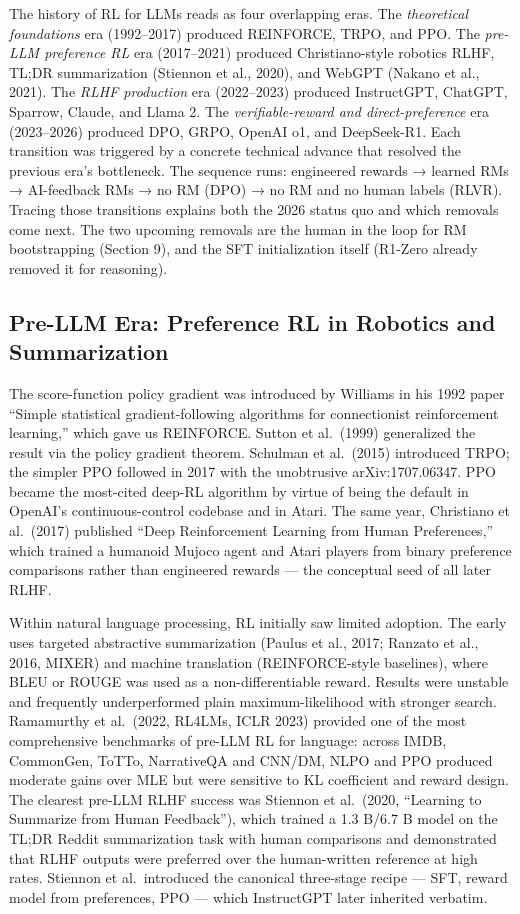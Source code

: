 The history of RL for LLMs reads as four overlapping eras. The \emph{theoretical foundations} era (1992--2017) produced REINFORCE, TRPO, and PPO. The \emph{pre-LLM preference RL} era (2017--2021) produced Christiano-style robotics RLHF, TL;DR summarization (Stiennon et al., 2020), and WebGPT (Nakano et al., 2021). The \emph{RLHF production} era (2022--2023) produced InstructGPT, ChatGPT, Sparrow, Claude, and Llama 2. The \emph{verifiable-reward and direct-preference} era (2023--2026) produced DPO, GRPO, OpenAI o1, and DeepSeek-R1. Each transition was triggered by a concrete technical advance that resolved the previous era's bottleneck. The sequence runs: engineered rewards → learned RMs → AI-feedback RMs → no RM (DPO) → no RM and no human labels (RLVR). Tracing those transitions explains both the 2026 status quo and which removals come next. The two upcoming removals are the human in the loop for RM bootstrapping (Section 9), and the SFT initialization itself (R1-Zero already removed it for reasoning).

\subsection{Pre-LLM Era: Preference RL in Robotics and Summarization}\label{pre-llm-era-preference-rl-in-robotics-and-summarization}

The score-function policy gradient was introduced by Williams in his 1992 paper ``Simple statistical gradient-following algorithms for connectionist reinforcement learning,'' which gave us REINFORCE. Sutton et al.~(1999) generalized the result via the policy gradient theorem. Schulman et al.~(2015) introduced TRPO; the simpler PPO followed in 2017 with the unobtrusive arXiv:1707.06347. PPO became the most-cited deep-RL algorithm by virtue of being the default in OpenAI's continuous-control codebase and in Atari. The same year, Christiano et al.~(2017) published ``Deep Reinforcement Learning from Human Preferences,'' which trained a humanoid Mujoco agent and Atari players from binary preference comparisons rather than engineered rewards --- the conceptual seed of all later RLHF.

Within natural language processing, RL initially saw limited adoption. The early uses targeted abstractive summarization (Paulus et al., 2017; Ranzato et al., 2016, MIXER) and machine translation (REINFORCE-style baselines), where BLEU or ROUGE was used as a non-differentiable reward. Results were unstable and frequently underperformed plain maximum-likelihood with stronger search. Ramamurthy et al.~(2022, RL4LMs, ICLR 2023) provided one of the most comprehensive benchmarks of pre-LLM RL for language: across IMDB, CommonGen, ToTTo, NarrativeQA and CNN/DM, NLPO and PPO produced moderate gains over MLE but were sensitive to KL coefficient and reward design. The clearest pre-LLM RLHF success was Stiennon et al.~(2020, ``Learning to Summarize from Human Feedback''), which trained a 1.3 B/6.7 B model on the TL;DR Reddit summarization task with human comparisons and demonstrated that RLHF outputs were preferred over the human-written reference at high rates. Stiennon et al.~introduced the canonical three-stage recipe --- SFT, reward model from preferences, PPO --- which InstructGPT later inherited verbatim.

